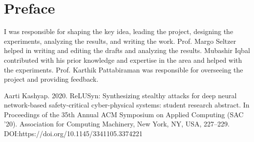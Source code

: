 
\chapter{Preface}

I was responsible for shaping the key idea, leading the project, designing the experiments, analyzing the results, and writing the work.
Prof. Margo Seltzer helped in writing and editing the drafts and analyzing the results. 
Mubashir Iqbal contributed with his prior knowledge and expertise in the area and helped with the experiments.
Prof. Karthik Pattabiraman was responsible for overseeing the project and providing feedback. 


Aarti Kashyap. 2020. ReLUSyn: Synthesizing stealthy attacks for deep neural network-based safety-critical cyber-physical systems: student research abstract. In Proceedings of the 35th Annual ACM Symposium on Applied Computing (SAC ’20). Association for Computing Machinery, New York, NY, USA, 227–229. DOI:https://doi.org/10.1145/3341105.3374221

